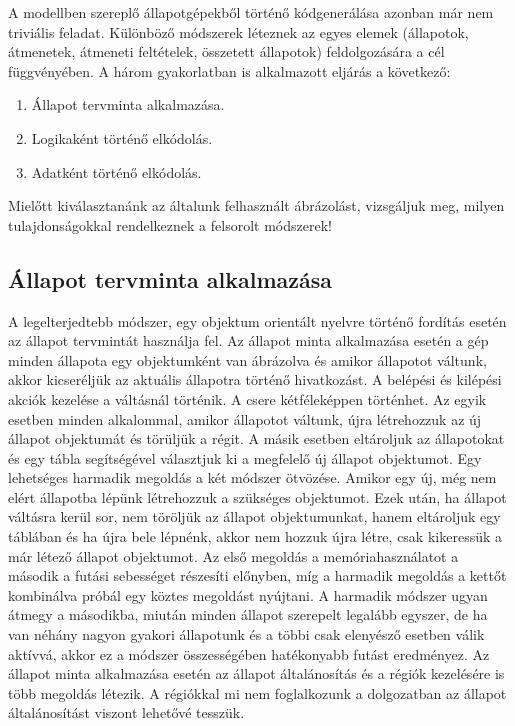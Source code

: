 \documentclass[a4paper,12pt]{report}
\begin{document}
A modellben szereplő állapotgépekből történő kódgenerálása azonban már nem triviális feladat. Különböző módszerek léteznek az egyes elemek (állapotok, átmenetek, átmeneti feltételek, összetett állapotok) feldolgozására \cite{AMT} 
a cél függvényében. A három gyakorlatban is alkalmazott eljárás a következő:
\begin{enumerate}
\item Állapot tervminta\cite{ERRJ:Design} alkalmazása.
\item Logikaként történő elkódolás.
\item Adatként történő elkódolás.
\end{enumerate}
Mielőtt kiválasztanánk az általunk felhasznált ábrázolást, vizsgáljuk meg, milyen tulajdonságokkal rendelkeznek a felsorolt módszerek!


\subsection{Állapot tervminta alkalmazása}

A legelterjedtebb módszer, egy objektum orientált nyelvre történő fordítás esetén az állapot tervmintát
használja fel. Az állapot minta alkalmazása esetén a gép minden állapota egy objektumként van ábrázolva és amikor állapotot váltunk, akkor kicseréljük az aktuális állapotra történő hivatkozást. A belépési és kilépési akciók kezelése a váltásnál történik. A csere kétféleképpen történhet. Az egyik esetben minden alkalommal,
amikor állapotot váltunk, újra létrehozzuk az új állapot objektumát és törüljük a régit. A másik esetben eltároljuk az állapotokat és egy tábla segítségével választjuk ki a megfelelő új állapot objektumot. Egy lehetséges harmadik megoldás a két módszer ötvözése. Amikor egy új, még
nem elért állapotba lépünk létrehozzuk a szükséges objektumot. Ezek után, ha állapot váltásra kerül sor, nem töröljük az állapot objektumunkat, hanem eltároljuk egy táblában és ha újra bele lépnénk, akkor nem hozzuk újra létre, csak kikeressük a már létező állapot objektumot. Az első megoldás a memóriahasználatot a második a futási sebességet részesíti előnyben, míg a harmadik megoldás a kettőt kombinálva próbál egy köztes megoldást nyújtani. A harmadik módszer ugyan átmegy a másodikba, miután minden állapot szerepelt legalább egyszer, de ha van néhány nagyon gyakori állapotunk és a többi csak elenyésző esetben válik aktívvá, akkor ez a módszer összességében hatékonyabb futást eredményez. Az állapot minta alkalmazása esetén az állapot általánosítás és a régiók kezelésére is több megoldás létezik. A régiókkal mi nem foglalkozunk a dolgozatban az állapot általánosítást viszont lehetővé tesszük.
\end{document}
